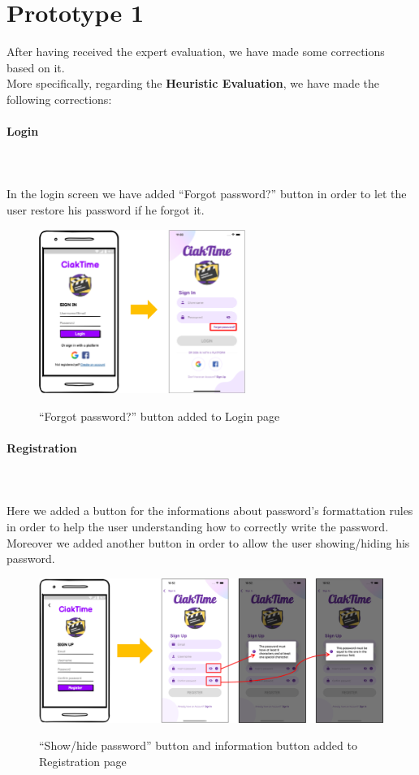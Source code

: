\documentclass[12pt, a4paper]{article}
\numberwithin{figure}{section}
\begin{document}

\newpage

\section{Prototype 1}

After having received the expert evaluation, we have made some corrections based on it.\\
More specifically, regarding the \textbf{Heuristic Evaluation}, we have made the following corrections:
\paragraph{Login}\mbox{}\\\\
In the login screen we have added “Forgot password?” button in order to let the user restore his password
if he forgot it.
\begin{figure}[H]
	\centering
	\includegraphics[width=0.6\textwidth]{images/prototype1/login.png}\\
	\caption{“Forgot password?” button added to Login page}
\end{figure}
\paragraph{Registration}
\mbox{}\\\\
Here we added a button for the informations about password's formattation rules in order to help the user 
understanding how to correctly write the password. Moreover we added another button in order to allow the user
showing/hiding his password.  
\begin{figure}[H]
	\centering
	\includegraphics[width=1\textwidth]{images/prototype1/registration.png}\\
	\caption{“Show/hide password” button and information button added to Registration page}
\end{figure}
\end{document}
